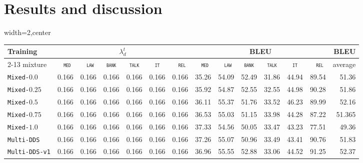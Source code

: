 \documentclass[11pt,a4paper]{article}
\newcommand{\domain}[1]{\texttt{\textsc{#1}}}
\newcommand{\system}[1]{\texttt{{#1}}}
\begin{document}
\section{Results and discussion \label{sec:results}}
\begin{table}
  \centering%
  \begin{adjustbox}{width=2\columnwidth,center}
  \begin{tabular}{|p{3.0cm}|*{13}{r|}} \hline
    \multirow{2}{*}{Training} & \multicolumn{6}{|c}{$\lambda^t_d$} & \multicolumn{6}{|c|}{BLEU} & \multirow{2}{*}{BLEU} \\ \cline{2-13}	
  mixture & \multicolumn{1}{c|}{\domain{ med}} & \multicolumn{1}{c|}{\domain{ law}} & \multicolumn{1}{c|}{\domain{bank}} & \multicolumn{1}{c|}{\domain{talk}} & \multicolumn{1}{c|}{\domain{ it }} & \multicolumn{1}{c|}{\domain{ rel}} & \multicolumn{1}{c|}{\domain{ med}} & \multicolumn{1}{c|}{\domain{ law}} & \multicolumn{1}{c|}{\domain{bank}} & \multicolumn{1}{c|}{\domain{talk}} & \multicolumn{1}{c|}{\domain{ it }} & \multicolumn{1}{c|}{\domain{ rel}} & average \\
    \hline
  \system{Mixed-$0.0$} & 0.166&0.166 &0.166 &0.166 &0.166 & 0.166 & 35.26 &54.09 &52.49& 31.86& 44.94& 89.54& 51.36\\
  \system{Mixed-$0.25$} & 0.166&0.166 &0.166 &0.166 &0.166 & 0.166 &35.92& 54.87& 52.55& 32.55& 44.98& 90.28& 51.86\\
  \system{Mixed-$0.5$} & 0.166&0.166 &0.166 &0.166 &0.166 & 0.166 &36.11& 55.37& 51.76& 33.52& 46.23& 89.99& 52.16\\
  \system{Mixed-$0.75$} & 0.166&0.166 &0.166 &0.166 &0.166 & 0.166 &36.53&	55.03& 51.15& 33.98& 44.28& 87.22& 51.365\\
  \system{Mixed-$1.0$} & 0.166&0.166 &0.166 &0.166 &0.166 & 0.166 &37.33& 54.56& 50.05& 33.47& 43.23& 77.51& 49.36\\
  \system{Multi-DDS} & 0.166&0.166 &0.166 &0.166 &0.166 & 0.166 & 37.26 & 55.07&50.96&33.49&43.41&90.76& 51.83 \\
  \system{Multi-DDS-v1} & 0.166&0.166 &0.166 &0.166 &0.166 & 0.166 & 36.96 & 55.55 & 52.88 & 33.06 & 44.52 &91.25 & 52.37\\
  \hline
  \end{tabular}
  \end{adjustbox}
\end{table}
\end{document}

